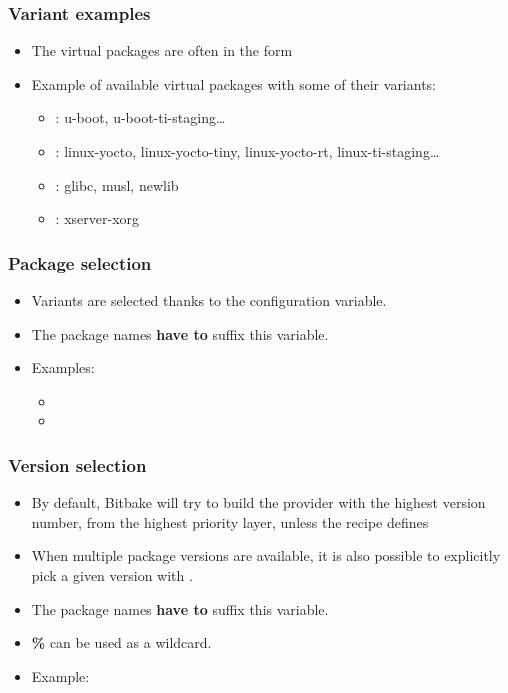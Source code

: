 \begin{frame}
  \frametitle{Variant examples}
  \begin{itemize}
    \item The virtual packages are often in the form
    \item Example of available virtual packages with some of their
      variants:
      \begin{itemize}
        \item {}: u-boot,
          u-boot-ti-staging\dots
        \item {}: linux-yocto, linux-yocto-tiny,
          linux-yocto-rt, linux-ti-staging\dots
        \item {}: glibc, musl, newlib
        \item {}: xserver-xorg
      \end{itemize}
  \end{itemize}
\end{frame}

\begin{frame}
  \frametitle{Package selection}
  \begin{itemize}
    \item Variants are selected thanks to the
       configuration variable.
    \item The package names {\bf have to} suffix this variable.
    \item Examples:
    \begin{itemize}
      \item {}
      \item {}
    \end{itemize}
  \end{itemize}
\end{frame}

\begin{frame}[fragile]
  \frametitle{Version selection}
  \begin{itemize}
    \item By default, Bitbake will try to build the provider with the
      highest version number, from the highest priority layer, unless the recipe defines
    \item When multiple package versions are available, it is also
      possible to explicitly pick a given version with
      .
    \item The package names {\bf have to} suffix this variable.
    \item {\bf \%} can be used as a wildcard.
    \item Example:
  \end{itemize}
\end{frame}

